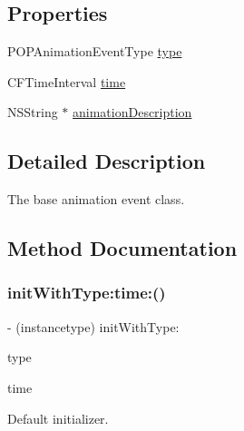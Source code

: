 \subsection*{Properties}
\begin{DoxyCompactItemize}
\item 
P\+O\+P\+Animation\+Event\+Type \mbox{\hyperlink{interface_p_o_p_animation_event_a3b510670ec4c3481bff1c5e4c0e8be94}{type}}
\item 
C\+F\+Time\+Interval \mbox{\hyperlink{interface_p_o_p_animation_event_a73554321ba6985a09a04a4e784fbaed4}{time}}
\item 
N\+S\+String $\ast$ \mbox{\hyperlink{interface_p_o_p_animation_event_a89b37f5524d6ec635e5b0fea936fc703}{animation\+Description}}
\end{DoxyCompactItemize}


\subsection{Detailed Description}
The base animation event class. 

\subsection{Method Documentation}
\mbox{\label{interface_p_o_p_animation_event_a58e93d7371be1fa88ba66202784c759b}} 
\subsubsection{\texorpdfstring{init\+With\+Type\+:time\+:()}{initWithType:time:()}\hspace{0.1cm}{\footnotesize\ttfamily [1/2]}}
{\footnotesize\ttfamily -\/ (instancetype) init\+With\+Type\+: \begin{DoxyParamCaption}\item[{(P\+O\+P\+Animation\+Event\+Type)}]{type }\item[{time:(C\+F\+Time\+Interval)}]{time }\end{DoxyParamCaption}\hspace{0.3cm}{\ttfamily [implementation]}}

Default initializer. \mbox{\label{interface_p_o_p_animation_event_a58e93d7371be1fa88ba66202784c759b}} 
